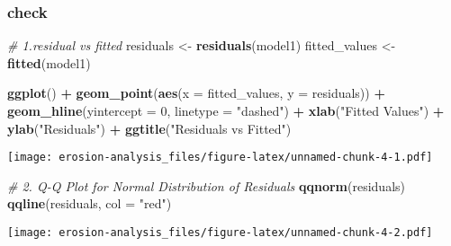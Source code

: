 \documentclass[
]{article}
\newenvironment{Shaded}{\begin{snugshade}}{\end{snugshade}}
\newcommand{\AttributeTok}[1]{\textcolor[rgb]{0.13,0.29,0.53}{#1}}
\newcommand{\CommentTok}[1]{\textcolor[rgb]{0.56,0.35,0.01}{\textit{#1}}}
\newcommand{\DecValTok}[1]{\textcolor[rgb]{0.00,0.00,0.81}{#1}}
\newcommand{\FunctionTok}[1]{\textcolor[rgb]{0.13,0.29,0.53}{\textbf{#1}}}
\newcommand{\NormalTok}[1]{#1}
\newcommand{\OtherTok}[1]{\textcolor[rgb]{0.56,0.35,0.01}{#1}}
\newcommand{\SpecialCharTok}[1]{\textcolor[rgb]{0.81,0.36,0.00}{\textbf{#1}}}
\newcommand{\StringTok}[1]{\textcolor[rgb]{0.31,0.60,0.02}{#1}}
\begin{document}
\hypertarget{check}{%
\subsubsection{check}\label{check}}

\begin{Shaded}
\begin{Highlighting}[]
\CommentTok{\# 1.residual vs fitted}
\NormalTok{residuals }\OtherTok{\textless{}{-}} \FunctionTok{residuals}\NormalTok{(model1)}
\NormalTok{fitted\_values }\OtherTok{\textless{}{-}} \FunctionTok{fitted}\NormalTok{(model1)}

\FunctionTok{ggplot}\NormalTok{() }\SpecialCharTok{+}
  \FunctionTok{geom\_point}\NormalTok{(}\FunctionTok{aes}\NormalTok{(}\AttributeTok{x =}\NormalTok{ fitted\_values, }\AttributeTok{y =}\NormalTok{ residuals)) }\SpecialCharTok{+}
  \FunctionTok{geom\_hline}\NormalTok{(}\AttributeTok{yintercept =} \DecValTok{0}\NormalTok{, }\AttributeTok{linetype =} \StringTok{"dashed"}\NormalTok{) }\SpecialCharTok{+}
  \FunctionTok{xlab}\NormalTok{(}\StringTok{"Fitted Values"}\NormalTok{) }\SpecialCharTok{+}
  \FunctionTok{ylab}\NormalTok{(}\StringTok{"Residuals"}\NormalTok{) }\SpecialCharTok{+}
  \FunctionTok{ggtitle}\NormalTok{(}\StringTok{"Residuals vs Fitted"}\NormalTok{)}
\end{Highlighting}
\end{Shaded}

\texttt{[image: erosion-analysis\_files/figure-latex/unnamed-chunk-4-1.pdf]}

\begin{Shaded}
\begin{Highlighting}[]
\CommentTok{\# 2. Q{-}Q Plot for Normal Distribution of Residuals}
\FunctionTok{qqnorm}\NormalTok{(residuals)}
\FunctionTok{qqline}\NormalTok{(residuals, }\AttributeTok{col =} \StringTok{"red"}\NormalTok{)}
\end{Highlighting}
\end{Shaded}

\texttt{[image: erosion-analysis\_files/figure-latex/unnamed-chunk-4-2.pdf]}
\end{document}
